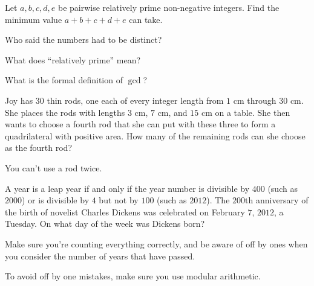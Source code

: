 \documentclass[mast]{lucky}
\begin{document}
\begin{prob}{2}
Let $a,b,c,d,e$ be pairwise relatively prime non-negative integers. Find the minimum value $a+b+c+d+e$ can take.
\begin{mistakes}
    \begin{mistake}
        Who said the numbers had to be distinct?
    \end{mistake}
    \begin{mistake}
        What does ``relatively prime'' mean?
    \end{mistake}
    \begin{mistake}
        What is the formal definition of $\gcd$?
    \end{mistake}
\end{mistakes}
\end{prob}

\begin{prob}[AMC 10A 2017/10]{2}
Joy has $30$ thin rods, one each of every integer length from $1$ cm through $30$ cm. She places the rods with lengths $3$ cm, $7$ cm, and $15$ cm on a table. She then wants to choose a fourth rod that she can put with these three to form a quadrilateral with positive area. How many of the remaining rods can she choose as the fourth rod?
\begin{mistakes}
    \begin{mistake}
        You can't use a rod twice.
    \end{mistake}
\end{mistakes}
\end{prob}

\begin{prob}[AMC 12A 2012/9]{3}
A year is a leap year if and only if the year number is divisible by $400$ (such as $2000$) or is divisible by $4$ but not by $100$ (such as $2012$). The $200\text{th}$ anniversary of the birth of novelist Charles Dickens was celebrated on February $7$, $2012$, a Tuesday. On what day of the week was Dickens born?
\begin{mistakes}
    \begin{mistake}
        Make sure you're counting everything correctly, and be aware of off by ones when you consider the number of years that have passed.
    \end{mistake}
    \begin{mistake}
        To avoid off by one mistakes, make sure you use modular arithmetic.
    \end{mistake}
\end{mistakes}
\end{prob}
\end{document}
